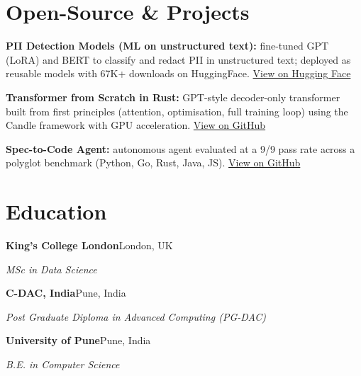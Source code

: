 \documentclass[10pt,a4paper]{article}
\begin{document}
\section{Open-Source \& Projects}
\begin{tight}
  \item \textbf{PII Detection Models (ML on unstructured text):} fine-tuned GPT (LoRA) and BERT to classify and redact PII in unstructured text; deployed as reusable models with 67K+ downloads on HuggingFace. \href{https://huggingface.co/ab-ai/pii_model}{View on Hugging Face}
  \item \textbf{Transformer from Scratch in Rust:} GPT-style decoder-only transformer built from first principles (attention, optimisation, full training loop) using the Candle framework with GPU acceleration. \href{https://github.com/abhijeetscode/transformer-rust}{View on GitHub}
  \item \textbf{Spec-to-Code Agent:} autonomous agent evaluated at a 9/9 pass rate across a polyglot benchmark (Python, Go, Rust, Java, JS). \href{https://github.com/abhijeetscode/Spec-to-Code-Agent}{View on GitHub}
\end{tight}

\section{Education}
{\color{company}\bfseries King's College London}\hfill {\color{muted}London, UK}\par
{\itshape MSc in Data Science}\par\vspace{2pt}
{\color{company}\bfseries C-DAC, India}\hfill {\color{muted}Pune, India}\par
{\itshape Post Graduate Diploma in Advanced Computing (PG-DAC)}\par\vspace{2pt}
{\color{company}\bfseries University of Pune}\hfill {\color{muted}Pune, India}\par
{\itshape B.E. in Computer Science}\par
\end{document}
